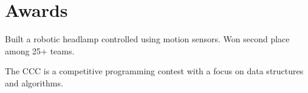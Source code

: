 \section{Awards} 

 
\smallsep
\begin{tightemize}
    \item Built a robotic headlamp controlled using motion sensors. Won second place among 25+ teams.
\end{tightemize}
\sectionsep

 
\smallsep
\begin{tightemize}
    \item The CCC is a competitive programming contest with a focus on data structures and algorithms.
\end{tightemize}
\sectionsep